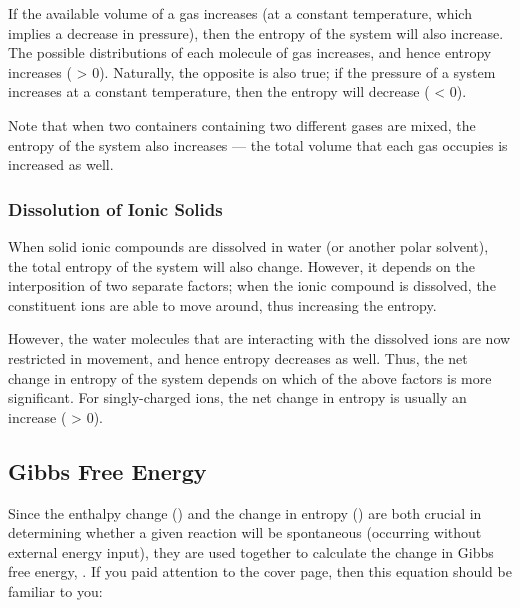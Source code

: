 				If the available volume of a gas increases (at a constant temperature, which implies a decrease in pressure), then the entropy
				of the system will also increase. The possible distributions of each molecule of gas increases, and hence entropy increases
				(\entr{} > 0). Naturally, the opposite is also true; if the pressure of a system increases at a constant temperature, then the entropy
				will decrease (\entr{} < 0).

				Note that when two containers containing two different gases are mixed, the entropy of the system also increases --- the total
				volume that each gas occupies is increased as well.



			\subsubsection{Dissolution of Ionic Solids}

				When solid ionic compounds are dissolved in water (or another polar solvent), the total entropy of the system will also change.
				However, it depends on the interposition of two separate factors; when the ionic compound is dissolved, the constituent ions are
				able to move around, thus increasing the entropy.

				However, the water molecules that are interacting with the dissolved ions are now restricted in movement, and hence entropy decreases
				as well. Thus, the net change in entropy of the system depends on which of the above factors is more significant. For singly-charged
				ions, the net change in entropy is usually an increase (\entr{} > 0).




		\pagebreak
		\subsection{Gibbs Free Energy}

			Since the enthalpy change (\enth{}) and the change in entropy (\entr{}) are both crucial in determining whether a given reaction will
			be spontaneous (occurring without external energy input), they are used together to calculate the change in Gibbs free energy, \gibb{}.
			If you paid attention to the cover page, then this equation should be familiar to you:


